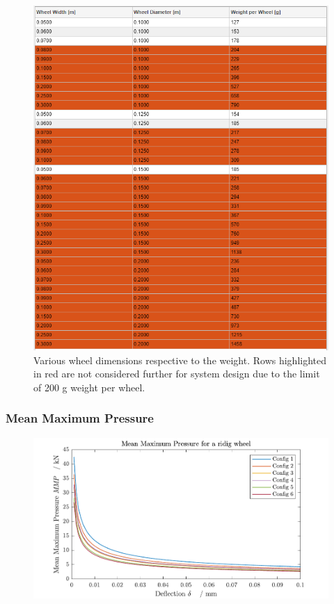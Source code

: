 \begin{figure}[htb] 
  \centering
     \includegraphics[width=1\textwidth]{Media/Dimensions-WeightLimits.png}
  \caption{Various wheel dimensions respective to the weight. Rows highlighted in red are not considered further for system design due to the limit of 200 g weight per wheel.}
  \label{fig:DimensionsLoco}
\end{figure}

\subsubsection*{Mean Maximum Pressure}
\label{app:MMP}


\begin{figure}[htb] 
  \centering
     \includegraphics[width=1\textwidth]{Media/MMP for each Config.pdf}
  \caption{}
  \label{fig:MMP}
\end{figure}

